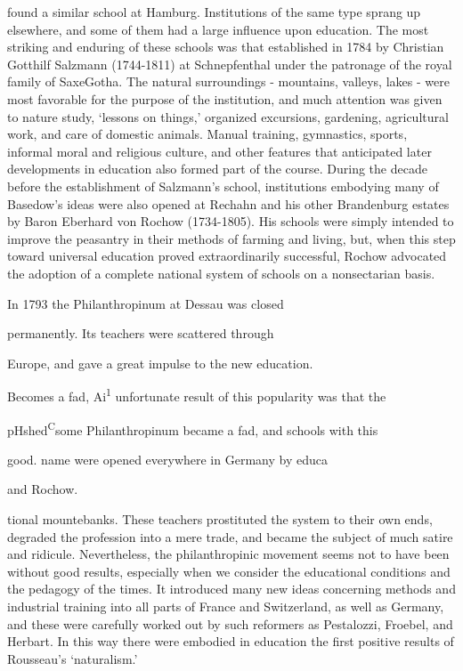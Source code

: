 \documentclass[
]{book}
\begin{document}
found a similar school at Hamburg. Institutions of the same type sprang up elsewhere, and some of them had a large influence upon education. The most striking and enduring of these schools was that established in 1784 by Christian Gotthilf Salzmann (1744-1811) at Schnepfenthal under the patronage of the royal family of SaxeGotha. The natural surroundings - mountains, valleys, lakes - were most favorable for the purpose of the institution, and much attention was given to nature study, `lessons on things,' organized excursions, gardening, agricultural work, and care of domestic animals. Manual training, gymnastics, sports, informal moral and religious culture, and other features that anticipated later developments in education also formed part of the course. During the decade before the establishment of Salzmann's school, institutions embodying many of Basedow's ideas were also opened at Rechahn and his other Brandenburg estates by Baron Eberhard von Rochow (1734-1805). His schools were simply intended to improve the peasantry in their methods of farming and living, but, when this step toward universal education proved extraordinarily successful, Rochow advocated the adoption of a complete national system of schools on a nonsectarian basis.

In 1793 the Philanthropinum at Dessau was closed

permanently. Its teachers were scattered through

Europe, and gave a great impulse to the new education.

Becomes a fad, Ai\textsuperscript{1} unfortunate result of this popularity was that the

pHshed\textsuperscript{C}some Philanthropinum became a fad, and schools with this

good. name were opened everywhere in Germany by educa

and Rochow.

tional mountebanks. These teachers prostituted the system to their own ends, degraded the profession into a mere trade, and became the subject of much satire and ridicule. Nevertheless, the philanthropinic movement seems not to have been without good results, especially when we consider the educational conditions and the pedagogy of the times. It introduced many new ideas concerning methods and industrial training into all parts of France and Switzerland, as well as Germany, and these were carefully worked out by such reformers as Pestalozzi, Froebel, and Herbart. In this way there were embodied in education the first positive results of Rousseau's `naturalism.'
\end{document}
